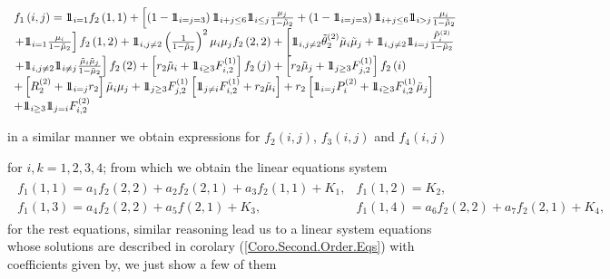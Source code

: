 \documentclass{article}
\newcommand{\indora}{\mbox{$1$\hspace{-0.8ex}$1$}}
\begin{document}
\begin{eqnarray}\label{Eq.Sdo.Orden.Exh.uno}
\begin{array}{l}
f_{1}\left(i,j\right)=\indora_{i=1}f_{2}\left(1,1\right)
+\left[\left(1-\indora_{i=j=3}\right)\indora_{i+j\leq6}\indora_{i\leq j}\frac{\mu_{j}}{1-\tilde{\mu}_{2}}
+\left(1-\indora_{i=j=3}\right)\indora_{i+j\leq6}\indora_{i>j}\frac{\mu_{i}}{1-\tilde{\mu}_{2}}\right.\\
\left.+\indora_{i=1}\frac{\mu_{i}}{1-\tilde{\mu}_{2}}\right]f_{2}\left(1,2\right)+\indora_{i,j\neq2}\left(\frac{1}{1-\tilde{\mu}_{2}}\right)^{2}\mu_{i}\mu_{j}f_{2}\left(2,2\right)
+\left[\indora_{i,j\neq2}\tilde{\theta}_{2}^{(2)}\tilde{\mu}_{i}\tilde{\mu}_{j}
+\indora_{i,j\neq2}\indora_{i=j}\frac{\tilde{P}_{i}^{(2)}}{1-\tilde{\mu}_{2}}\right.\\
\left.+\indora_{i,j\neq2}\indora_{i\neq j}\frac{\tilde{\mu}_{i}\tilde{\mu}_{j}}{1-\tilde{\mu}_{2}}\right]f_{2}\left(2\right)
+\left[r_{2}\tilde{\mu}_{i}
+\indora_{i\geq3}F_{i,2}^{(1)}\right]f_{2}\left(j\right)
+\left[r_{2}\tilde{\mu}_{j}
+\indora_{j\geq3}F_{j,2}^{(1)}\right]f_{2}\left(i\right)\\
+\left[R_{2}^{(2)}
+\indora_{i=j}r_{2}\right]\tilde{\mu}_{i}\mu_{j}+\indora_{j\geq3}F_{j,2}^{(1)}\left[\indora_{j\neq i}F_{i,2}^{(1)}
+r_{2}\tilde{\mu}_{i}\right]
+r_{2}\left[\indora_{i=j}P_{i}^{(2)}
+\indora_{i\geq3}F_{i,2}^{(1)}\tilde{\mu}_{j}\right]\\
+\indora_{i\geq3}\indora_{j=i}F_{i,2}^{(2)}
\end{array}
\end{eqnarray}

in a similar manner we obtain expressions for $f_{2}\left(i,j\right)$, $f_{3}\left(i,j\right)$ and $f_{4}\left(i,j\right)$

for $i,k=1,2,3,4$; from which we obtain the linear equations system
\begin{eqnarray}\label{System.Second.Order.Moments.uno}
\begin{array}{ll}
f_{1}\left(1,1\right)=a_{1}f_{2}\left(2,2\right)
+a_{2}f_{2}\left(2,1\right)
+a_{3}f_{2}\left(1,1\right)
+K_{1},&
f_{1}\left(1,2\right)=K_{2},\\
f_{1}\left(1,3\right)=a_{4}f_{2}\left(2,2\right)+a_{5}f\left(2,1\right)+K_{3},&
f_{1}\left(1,4\right)=a_{6}f_{2}\left(2,2\right)+a_{7}f_{2}\left(2,1\right)+K_{4},\end{array}
\end{eqnarray}
for the rest equations, similar reasoning lead us to a linear system equations whose solutions are described in corolary (\ref{Coro.Second.Order.Eqs}) with coefficients given by, we just show a few of them
\end{document}
